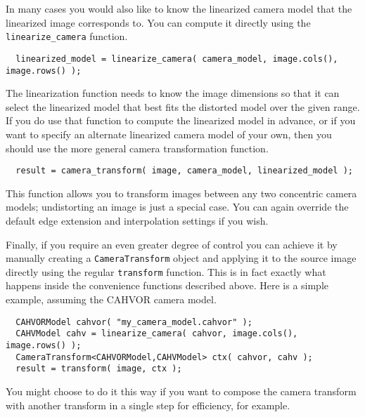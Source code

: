 In many cases you would also like to know the linearized camera model that the 
linearized image corresponds to.  You can compute it directly using the 
\verb#linearize_camera# function.
\begin{verbatim}
  linearized_model = linearize_camera( camera_model, image.cols(), image.rows() );
\end{verbatim}
The linearization function needs to know the image dimensions so that
it can select the linearized model that best fits the distorted model
over the given range.  If you do use that function to compute the
linearized model in advance, or if you want to specify an alternate
linearized camera model of your own, then you should use the more general 
camera transformation function.
\begin{verbatim}
  result = camera_transform( image, camera_model, linearized_model );
\end{verbatim}
This function allows you to transform images between any two concentric 
camera models; undistorting an image is just a special case.  You can again 
override the default edge extension and interpolation settings if you wish.

Finally, if you require an even greater degree of control you can
achieve it by manually creating a \verb#CameraTransform# object and
applying it to the source image directly using the regular
\verb#transform# function.  This is in fact exactly what happens inside 
the convenience functions described above.  Here is a simple example, 
assuming the CAHVOR camera model.
\begin{verbatim}
  CAHVORModel cahvor( "my_camera_model.cahvor" );
  CAHVModel cahv = linearize_camera( cahvor, image.cols(), image.rows() );
  CameraTransform<CAHVORModel,CAHVModel> ctx( cahvor, cahv );
  result = transform( image, ctx );
\end{verbatim}
You might choose to do it this way if you want to compose the camera
transform with another transform in a single step for efficiency, 
for example.
